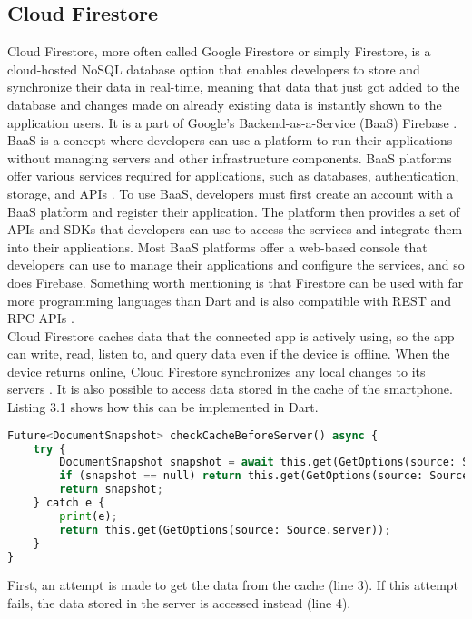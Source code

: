 \subsection{Cloud Firestore}
Cloud Firestore, more often called Google Firestore or simply Firestore, is a cloud-hosted NoSQL database option that enables developers to store and synchronize their data in real-time, meaning that data that just got added to the database and changes made on already existing data is instantly shown to the application users. It is a part of Google's Backend-as-a-Service (BaaS) Firebase \cite[p. 458 ]{.baasfirebase}. BaaS is a concept where developers can use a platform to run their applications without managing servers and other infrastructure components. BaaS platforms offer various services required for applications, such as databases, authentication, storage, and APIs \cite{.baasokta}. To use BaaS, developers must first create an account with a BaaS platform and register their application. The platform then provides a set of APIs and SDKs that developers can use to access the services and integrate them into their applications. Most BaaS platforms offer a web-based console that developers can use to manage their applications and configure the services, and so does Firebase. Something worth mentioning is that Firestore can be used with far more programming languages than Dart and is also compatible with REST and RPC APIs \cite{.firestore}.
\newline \\
Cloud Firestore caches data that the connected app is actively using, so the app can write, read, listen to, and query data even if the device is offline. When the device returns online, Cloud Firestore synchronizes any local changes to its servers \cite{.firestore}. It is also possible to access data stored in the cache of the smartphone. Listing 3.1 shows how this can be implemented in Dart.
\begin{lstlisting}[language=Python, caption={Firestore and Dart - getting Cache-data}]
Future<DocumentSnapshot> checkCacheBeforeServer() async {
	try {
		DocumentSnapshot snapshot = await this.get(GetOptions(source: Source.cache));
		if (snapshot == null) return this.get(GetOptions(source: Source.server));
		return snapshot;
	} catch e {
		print(e);
		return this.get(GetOptions(source: Source.server));
	}
}	
\end{lstlisting}
\noindent
First, an attempt is made to get the data from the cache (line 3). If this attempt fails, the data stored in the server is accessed instead (line 4).

